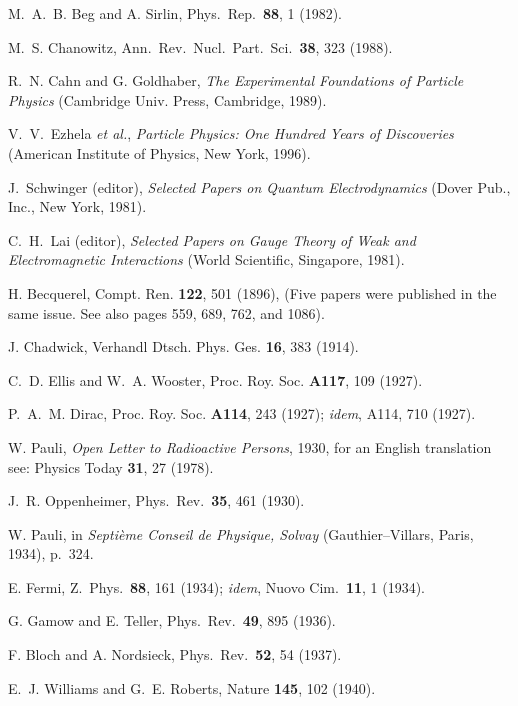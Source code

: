 \documentclass[12pt]{report}
\begin{document}
\begin{thebibliography}{100}
M.~A.~B. Beg and A. Sirlin, Phys.\ Rep.\ {\bf 88},  1  (1982).

M.~S. Chanowitz, Ann.\ Rev.\ Nucl.\ Part.\ Sci.\ {\bf 38},  323  (1988).

R.~N. Cahn and G. Goldhaber, {\em The Experimental Foundations of Particle
  Physics} (Cambridge Univ. Press, Cambridge, 1989).

V.~V.~Ezhela {{\it et al.}}, {\em Particle Physics: One Hundred Years of
  Discoveries} (American Institute of Physics, New York, 1996).

J.~Schwinger {(editor)}, {\em Selected Papers on Quantum Electrodynamics}
  (Dover Pub., Inc., New York, 1981).

C.~H.~Lai {(editor)}, {\em Selected Papers on Gauge Theory of Weak and
  Electromagnetic Interactions} (World Scientific, Singapore, 1981).

H. Becquerel, Compt. Ren. {\bf 122},  501  (1896), ({F}ive papers were
  published in the same issue. See also pages 559, 689, 762, and 1086).

J. Chadwick, Verhandl Dtsch. Phys. Ges. {\bf 16},  383  (1914).

C.~D. Ellis and W.~A. Wooster, Proc. Roy. Soc. {\bf A117},  109  (1927).

P.~A.~M. Dirac, Proc. Roy. Soc. {\bf A114},  243  (1927); {\it idem}, A114, 710
  (1927).

W. Pauli, {\it Open Letter to Radioactive Persons}, 1930, for an English
  translation see: Physics Today {\bf 31}, 27 (1978).

J.~R. Oppenheimer, Phys.\ Rev.\ {\bf 35},  461  (1930).

W. Pauli,  in {\em Septi\`eme Conseil de Physique, Solvay} (Gauthier--Villars,
  Paris, 1934), p.\ 324.

E. Fermi, Z.\ Phys.\ {\bf 88},  161  (1934); {\it idem}, Nuovo Cim.\ {\bf 11},
  1 (1934).

G. Gamow and E. Teller, Phys.\ Rev.\ {\bf 49},  895  (1936).

F. Bloch and A. Nordsieck, Phys.\ Rev.\ {\bf 52},  54  (1937).

E.~J. Williams and G.~E. Roberts, Nature {\bf 145},  102  (1940).


\end{thebibliography}
\end{document}
